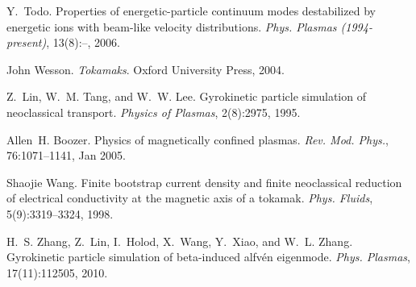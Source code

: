 \documentclass{article}
\newcommand{\tmtextit}[1]{{\itshape{#1}}}
\begin{document}
\begin{thebibliography}{1}
  Y.~Todo. {\newblock}Properties of energetic-particle
  continuum modes destabilized by energetic ions with beam-like velocity
  distributions. {\newblock}\tmtextit{Phys. Plasmas (1994-present)}, 13(8):--,
  2006.
  
  John Wesson. {\newblock}\tmtextit{Tokamaks}.
  {\newblock}Oxford University Press, 2004.
  
  Z.~Lin, W.~M. Tang, and W.~W. Lee.
  {\newblock}Gyrokinetic particle simulation of neoclassical transport.
  {\newblock}\tmtextit{Physics of Plasmas}, 2(8):2975, 1995.
  
  Allen~H. Boozer. {\newblock}Physics of magnetically
  confined plasmas. {\newblock}\tmtextit{Rev. Mod. Phys.}, 76:1071--1141, Jan
  2005.
  
  Shaojie Wang. {\newblock}Finite bootstrap current
  density and finite neoclassical reduction of electrical conductivity at the
  magnetic axis of a tokamak. {\newblock}\tmtextit{Phys. Fluids},
  5(9):3319--3324, 1998.
  
  H.~S. Zhang, Z.~Lin, I.~Holod, X.~Wang, Y.~Xiao, and
  W.~L. Zhang. {\newblock}Gyrokinetic particle simulation of beta-induced
  alfv{\'e}n eigenmode. {\newblock}\tmtextit{Phys. Plasmas}, 17(11):112505,
  2010.
\end{thebibliography}
\end{document}
